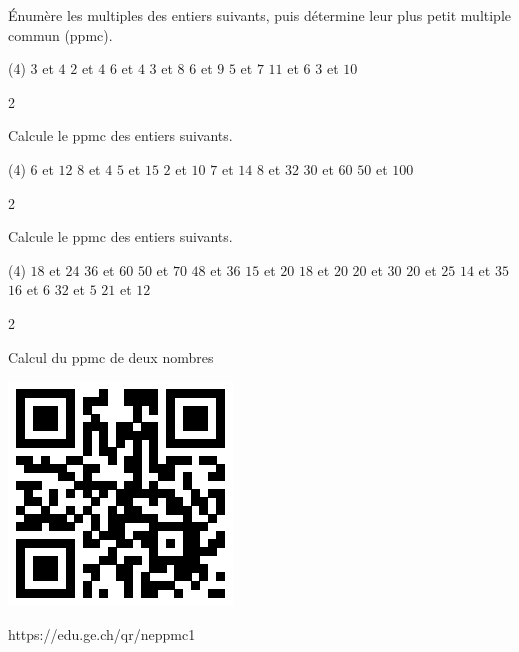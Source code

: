 \documentclass[a4paper,12pt]{report}
\begin{document}
\vfill

\begin{exo}{
    Énumère les multiples des entiers suivants, puis détermine leur plus petit multiple commun (ppmc).
\begin{tasks}(4)
    \task $3$ et $4$
    \task $2$ et $4$
    \task $6$ et $4$
    \task $3$ et $8$
    \task $6$ et $9$
    \task $5$ et $7$
    \task $11$ et $6$
    \task $3$ et $10$
\end{tasks}
}{2}\end{exo}


\vfill

\newpage

\begin{exo}{
    Calcule le ppmc des entiers suivants.

\begin{tasks}[after-item-skip = 0.5em](4)
    \task $6$ et $12$
    \task $8$ et $4$
    \task $5$ et $15$
    \task $2$ et $10$
    \task $7$ et $14$
    \task $8$ et $32$
    \task $30$ et $60$
    \task $50$ et $100$
\end{tasks}
}{2}\end{exo}


\vfill

\begin{exo}{
    Calcule le ppmc des entiers suivants.


\begin{tasks}[after-item-skip = 0.5em](4)
    \task $18$ et $24$
    \task $36$ et $60$
    \task $50$ et $70$
    \task $48$ et $36$
    \task $15$ et $20$
    \task $18$ et $20$
    \task $20$ et $30$
    \task $20$ et $25$
    \task $14$ et $35$
    \task $16$ et $6$
    \task $32$ et $5$
    \task $21$ et $12$
\end{tasks}
}{2}\end{exo}

\vfill

\begin{qmun}{Calcul du ppmc de deux nombres}{
		\begin{center}
\includegraphics[scale=1]{media/qr/neppmc1 }

\tiny{{https://edu.ge.ch/qr/neppmc1}}
		\end{center}
	}
\end{qmun}
\end{document}
